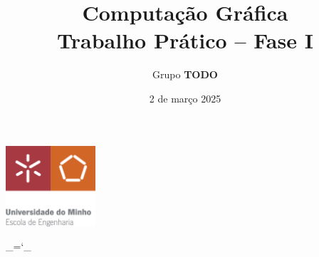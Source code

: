 \documentclass[12pt, a4paper]{article}
\title{\Huge \textbf{Computação Gráfica \\ \Large Trabalho Prático -- Fase I}}
\date{2 de março 2025}
\author{Grupo \textbf{\color{red} TODO}}
\begin{document}
\begin{center}
    \includegraphics[width=0.25\textwidth]{res/cover/EE-C.eps}
\end{center}

\chardef\_=`_
\onehalfspacing
\setlength{\parskip}{\baselineskip}
\setlength{\parindent}{0pt}
\def\arraystretch{1.5}

{\let\newpage\relax\maketitle}
\maketitle
\thispagestyle{empty}

\vspace*{\fill}
\end{document}
